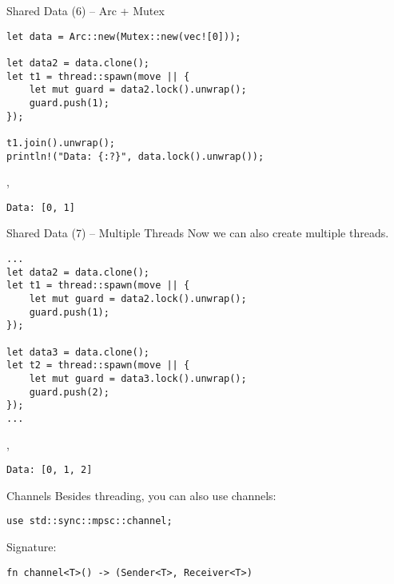 \begin{frame}[fragile]{Shared Data (6) -- Arc + Mutex}
\begin{verbatim}
let data = Arc::new(Mutex::new(vec![0]));

let data2 = data.clone();
let t1 = thread::spawn(move || {
    let mut guard = data2.lock().unwrap();
    guard.push(1);
});

t1.join().unwrap();
println!("Data: {:?}", data.lock().unwrap());
\end{verbatim}
\sep
\begin{verbatim}
Data: [0, 1]
\end{verbatim}
\end{frame}

\begin{frame}[fragile]{Shared Data (7) -- Multiple Threads}
Now we can also create multiple threads.
\begin{verbatim}
...
let data2 = data.clone();
let t1 = thread::spawn(move || {
    let mut guard = data2.lock().unwrap();
    guard.push(1);
});

let data3 = data.clone();
let t2 = thread::spawn(move || {
    let mut guard = data3.lock().unwrap();
    guard.push(2);
});
...
\end{verbatim}
\sep
\begin{verbatim}
Data: [0, 1, 2]
\end{verbatim}
\end{frame}

\begin{frame}[fragile]{Channels}
Besides threading, you can also use channels:
\begin{verbatim}
use std::sync::mpsc::channel;
\end{verbatim}
Signature:
\begin{verbatim}
fn channel<T>() -> (Sender<T>, Receiver<T>)
\end{verbatim}
\end{frame}
